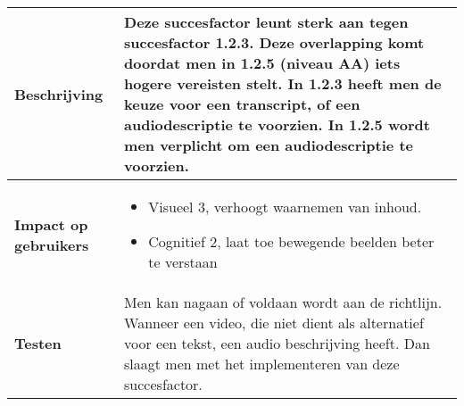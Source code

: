 \begin{table}[H]
\begin{tabular}{|l|p{12cm}|}
        \hline
        \textbf{Beschrijving}                & Deze succesfactor leunt sterk aan tegen succesfactor 1.2.3. Deze overlapping komt doordat men in 1.2.5 (niveau AA) iets hogere vereisten stelt. In 1.2.3 heeft men de keuze voor een transcript, of een audiodescriptie te voorzien. In 1.2.5 wordt men verplicht om een audiodescriptie te voorzien. \\ 
        \hline
        \textbf{Impact op gebruikers}        & 
        \begin{itemize}
            \item Visueel 3, verhoogt waarnemen van inhoud. 
            \item Cognitief 2, laat toe bewegende beelden beter te verstaan            
        \end{itemize}                                                                                                                   \\ 
       
        \hline
        \textbf{Testen}                      & Men kan nagaan of voldaan wordt aan de richtlijn. Wanneer een video, die niet dient als alternatief voor een tekst, een audio beschrijving heeft. Dan slaagt men met het implementeren van deze succesfactor.                                                                                                                                                              \\
        \hline
    \end{tabular}
\end{table}


    

